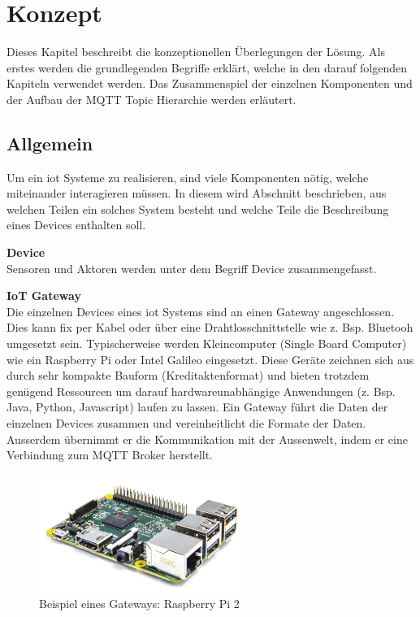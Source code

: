 \chapter{Konzept}
\label{chap:konzept}

Dieses Kapitel beschreibt die konzeptionellen Überlegungen der Lösung. Als erstes werden die grundlegenden Begriffe erklärt, welche in den darauf folgenden Kapiteln verwendet werden. Das Zusammenspiel der einzelnen Komponenten und der Aufbau der MQTT Topic Hierarchie werden erläutert. 

\section{Allgemein}

Um ein \gls{iot} Systeme zu realisieren, sind viele Komponenten nötig, welche miteinander interagieren müssen. In diesem wird Abschnitt beschrieben, aus welchen Teilen ein solches System besteht und welche Teile die Beschreibung eines Devices enthalten soll.

\textbf{Device} \\
Sensoren und Aktoren werden unter dem Begriff Device zusammengefasst.


\textbf{IoT Gateway} \\
Die einzelnen Devices eines \gls{iot} Systems sind an einen Gateway angeschlossen. Dies kann fix per Kabel oder über eine Drahtlosschnittstelle wie z. Bsp. Bluetooh umgesetzt sein. Typischerweise werden Kleincomputer (Single Board Computer) wie ein Raspberry Pi oder Intel Galileo eingesetzt. Diese Geräte zeichnen sich aus durch sehr kompakte Bauform (Kreditaktenformat) und bieten trotzdem genügend Ressourcen um darauf hardwareunabhängige Anwendungen (z. Bsp. Java, Python, Javascript) laufen zu lassen. 
Ein Gateway führt die Daten der einzelnen Devices zusammen und vereinheitlicht die Formate der Daten. Ausserdem übernimmt er die Kommunikation mit der Aussenwelt, indem er eine Verbindung zum MQTT Broker herstellt.

\begin{figure}[H]
	\centering
		\includegraphics[width=0.6\textwidth]{bilder/raspi_2.jpg}
	\caption{Beispiel eines Gateways: Raspberry Pi 2}
\end{figure}

